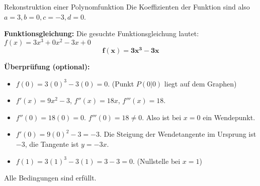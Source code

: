 \begin{loesungsumgebung}{Rekonstruktion einer Polynomfunktion}
Die Koeffizienten der Funktion sind also $a=3, b=0, c=-3, d=0$.

\textbf{Funktionsgleichung:}
Die gesuchte Funktionsgleichung lautet:
$f(x) = 3x^3 + 0x^2 - 3x + 0$
$$ \mathbf{f(x) = 3x^3 - 3x} $$

\textbf{Überprüfung (optional):}
\begin{itemize}
    \item $f(0) = 3(0)^3 - 3(0) = 0$. (Punkt $P(0|0)$ liegt auf dem Graphen)
    \item $f'(x) = 9x^2 - 3$, $f''(x) = 18x$, $f'''(x) = 18$.
    \item $f''(0) = 18(0) = 0$. $f'''(0) = 18 \neq 0$. Also ist bei $x=0$ ein Wendepunkt.
    \item $f'(0) = 9(0)^2 - 3 = -3$. Die Steigung der Wendetangente im Ursprung ist $-3$, die Tangente ist $y=-3x$.
    \item $f(1) = 3(1)^3 - 3(1) = 3-3=0$. (Nullstelle bei $x=1$)
\end{itemize}
Alle Bedingungen sind erfüllt.
\end{loesungsumgebung}


